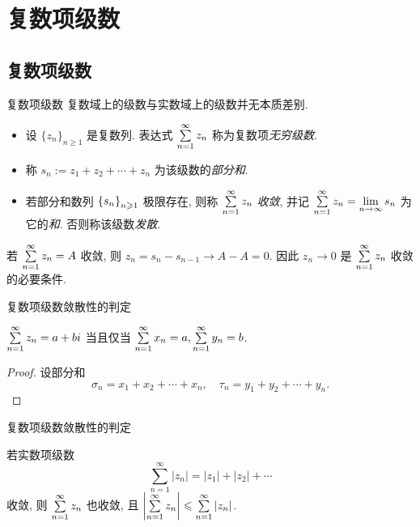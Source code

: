 \section{复数项级数}

\subsection{复数项级数}
\begin{frame}{复数项级数}
	\onslide<+->
	复数域上的级数与实数域上的级数并无本质差别.

	\onslide<+->
	\begin{definition}
		\begin{itemize}
			\item 设 $\{z_n\}_{n\ge1}$ 是复数列. 表达式 $\sum\limits_{n=1}^\infty z_n$ 称为复数项\emph{无穷级数}.
			\item 称 $s_n:=z_1+z_2+\cdots+z_n$ 为该级数的\emph{部分和}.
			\item 若部分和数列 ${\left\{s_n\right\}}_{n\geqslant 1}$ 极限存在, 则称 $\sum\limits_{n=1}^\infty z_n$ \emph{收敛}, 并记 $\sum\limits_{n=1}^\infty z_n=\lim\limits_{n\to\infty}s_n$ 为它的\emph{和}. 否则称该级数\emph{发散}.
		\end{itemize}
	\end{definition}

	\onslide<+->
	若 $\sum\limits_{n=1}^\infty z_n=A$ 收敛, 则 $z_n=s_n-s_{n-1}\to A-A=0$.
	\onslide<+->
	因此 \alert{$z_n\to0$ 是 $\sum\limits_{n=1}^\infty z_n$ 收敛的必要条件}.
\end{frame}


\begin{frame}{复数项级数敛散性的判定}
	\onslide<+->
	\begin{theorem}
		$\sum\limits_{n=1}^\infty z_n=a+bi$ 当且仅当 $\sum\limits_{n=1}^\infty x_n=a,\sum\limits_{n=1}^\infty y_n=b$.
	\end{theorem}

	\onslide<+->
	\begin{proof}
		设部分和
		\[\sigma_n=x_1+x_2+\cdots+x_n,\quad
			\tau_n=y_1+y_2+\cdots+y_n.\]
		\onslide<+->{于是命题得证.\qedhere}
	\end{proof}
\end{frame}


\begin{frame}{复数项级数敛散性的判定}
	\onslide<+->
	\begin{theorem}
		若实数项级数
		\[\sum_{n=1}^\infty|z_n|=|z_1|+|z_2|+\cdots\]
		收敛, 则 $\sum\limits_{n=1}^\infty z_n$ 也收敛, 且 $\left|\sum\limits_{n=1}^\infty z_n\right|\leqslant\sum\limits_{n=1}^\infty |z_n|$.
	\end{theorem}
\end{frame}


